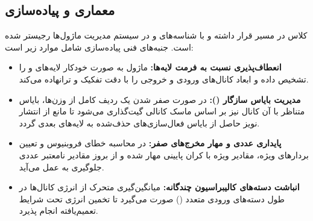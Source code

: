 \subsection{معماری و پیاده‌سازی}
کلاس  در مسیر  قرار داشته و با شناسه‌های  و  در سیستم مدیریت ماژول‌ها رجیستر شده است. جنبه‌های فنی پیاده‌سازی شامل موارد زیر است:
\begin{itemize}
    \item \textbf{انعطاف‌پذیری نسبت به فرمت لایه‌ها:} ماژول به صورت خودکار لایه‌های  و  را تشخیص داده و ابعاد کانال‌های ورودی و خروجی را با دقت تفکیک و ترانهاده می‌کند.
    \item \textbf{مدیریت بایاس سازگار ():} در صورت صفر شدن یک ردیف کامل از وزن‌ها، بایاس متناظر با آن کانال نیز بر اساس ماسک کانالی گیت‌گذاری می‌شود تا مانع از انتشار نویز حاصل از بایاس فعال‌سازی‌های حذف‌شده به لایه‌های بعدی گردد.
    \item \textbf{پایداری عددی و مهار مخرج‌های صفر:} در محاسبه خطای فروبنیوس و تعیین بردارهای ویژه، مقادیر ویژه با کران پایینی مهار شده و از بروز مقادیر نامعتبر عددی جلوگیری به عمل می‌آید.
    \item \textbf{انباشت دسته‌های کالیبراسیون چندگانه:} میانگین‌گیری متحرک از انرژی کانال‌ها در طول دسته‌های ورودی متعدد () صورت می‌گیرد تا تخمین انرژی تحت شرایط تعمیم‌یافته انجام پذیرد.
\end{itemize}
